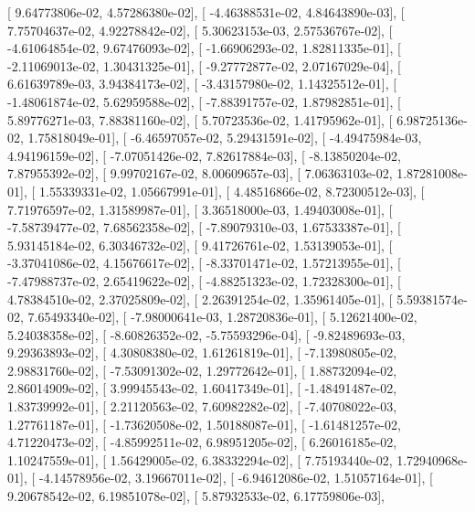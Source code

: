 \documentclass{article}
\begin{document}
       [  9.64773806e-02,   4.57286380e-02],
       [ -4.46388531e-02,   4.84643890e-03],
       [  7.75704637e-02,   4.92278842e-02],
       [  5.30623153e-03,   2.57536767e-02],
       [ -4.61064854e-02,   9.67476093e-02],
       [ -1.66906293e-02,   1.82811335e-01],
       [ -2.11069013e-02,   1.30431325e-01],
       [ -9.27772877e-02,   2.07167029e-04],
       [  6.61639789e-03,   3.94384173e-02],
       [ -3.43157980e-02,   1.14325512e-01],
       [ -1.48061874e-02,   5.62959588e-02],
       [ -7.88391757e-02,   1.87982851e-01],
       [  5.89776271e-03,   7.88381160e-02],
       [  5.70723536e-02,   1.41795962e-01],
       [  6.98725136e-02,   1.75818049e-01],
       [ -6.46597057e-02,   5.29431591e-02],
       [ -4.49475984e-03,   4.94196159e-02],
       [ -7.07051426e-02,   7.82617884e-03],
       [ -8.13850204e-02,   7.87955392e-02],
       [  9.99702167e-02,   8.00609657e-03],
       [  7.06363103e-02,   1.87281008e-01],
       [  1.55339331e-02,   1.05667991e-01],
       [  4.48516866e-02,   8.72300512e-03],
       [  7.71976597e-02,   1.31589987e-01],
       [  3.36518000e-03,   1.49403008e-01],
       [ -7.58739477e-02,   7.68562358e-02],
       [ -7.89079310e-03,   1.67533387e-01],
       [  5.93145184e-02,   6.30346732e-02],
       [  9.41726761e-02,   1.53139053e-01],
       [ -3.37041086e-02,   4.15676617e-02],
       [ -8.33701471e-02,   1.57213955e-01],
       [ -7.47988737e-02,   2.65419622e-02],
       [ -4.88251323e-02,   1.72328300e-01],
       [  4.78384510e-02,   2.37025809e-02],
       [  2.26391254e-02,   1.35961405e-01],
       [  5.59381574e-02,   7.65493340e-02],
       [ -7.98000641e-03,   1.28720836e-01],
       [  5.12621400e-02,   5.24038358e-02],
       [ -8.60826352e-02,  -5.75593296e-04],
       [ -9.82489693e-03,   9.29363893e-02],
       [  4.30808380e-02,   1.61261819e-01],
       [ -7.13980805e-02,   2.98831760e-02],
       [ -7.53091302e-02,   1.29772642e-01],
       [  1.88732094e-02,   2.86014909e-02],
       [  3.99945543e-02,   1.60417349e-01],
       [ -1.48491487e-02,   1.83739992e-01],
       [  2.21120563e-02,   7.60982282e-02],
       [ -7.40708022e-03,   1.27761187e-01],
       [ -1.73620508e-02,   1.50188087e-01],
       [ -1.61481257e-02,   4.71220473e-02],
       [ -4.85992511e-02,   6.98951205e-02],
       [  6.26016185e-02,   1.10247559e-01],
       [  1.56429005e-02,   6.38332294e-02],
       [  7.75193440e-02,   1.72940968e-01],
       [ -4.14578956e-02,   3.19667011e-02],
       [ -6.94612086e-02,   1.51057164e-01],
       [  9.20678542e-02,   6.19851078e-02],
       [  5.87932533e-02,   6.17759806e-03],
\end{document}
